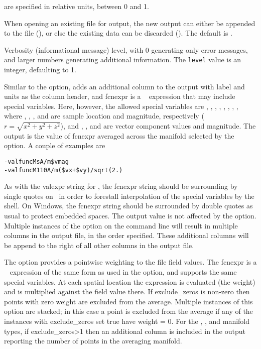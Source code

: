\begin{description}
  are specified in relative units, between 0 and 1.
\item[\optkey{-truncate \boa 0\pipe 1\bca}]
  When opening an existing file for output, the new output can either be
  appended to the file (), or else the existing data
  can be discarded ().  The default is .
\item[\optkey{-v level}]
  Verbosity (informational message) level, with 0 generating only
  error messages, and larger numbers generating additional information.
  The {\tt level} value is an integer, defaulting to 1.
\item[\optkey{-valfunc label units fcnexpr}]
  Similar to the  option,  adds an additional
  column to the output with label and units as the column header, and
  fcnexpr is a \Tcl\  expression that may include special
  variables.  Here, however, the allowed special variables are
  , , , ,
  , , , , where
  , , , and  are sample location and
  magnitude, respectively ($r = \sqrt{x^2+y^2+z^2}$), and
  , ,  and  are vector component
  values and magnitude.  The output is the value of fcnexpr averaged
  across the manifold selected by the  option.  A couple
  of examples are
\begin{alltt}
   -valfunc Ms   A/m \ssquote\$vmag\ssquote
   -valfunc M110 A/m \ssquote(\$vx+\$vy)/sqrt(2.)\ssquote
\end{alltt}
  As with the valexpr string for , the fcnexpr string
  should be surrounding by single quotes on \Unix\ in order to
  forestall interpolation of the special variables by the shell.  On
  Windows, the fcnexpr string should be surrounded by double quotes as
  usual to protect embedded spaces.
  The output value is not affected by the  option.
  Multiple instances of the
   option on the command line will result in multiple
  columns in the output file, in the order specified.  These
  additional columns will be append to the right of all other columns in
  the output file.
\item[\optkey{-wgtfunc fcnexpr exclude\_zeros}]
  The  option provides a pointwise weighting to the file
  field values. The fcnexpr is a \Tcl\  expression of the same
  form as used in the  option, and supports the same special
  variables. At each spatial location the expression is evaluated (the
  weight) and is multiplied against the field value there. If
  exclude\_zeros is non-zero then points with zero weight are excluded
  from the average. Multiple instances of this option are stacked; in
  this case a point is excluded from the average if any of the instances
  with exclude\_zeros set true have weight = 0. For the ,
  , and  manifold types, if exclude\_zeros>1 then
  an additional column is included in the output reporting the number
  of points in the averaging manifold.


\end{description}
